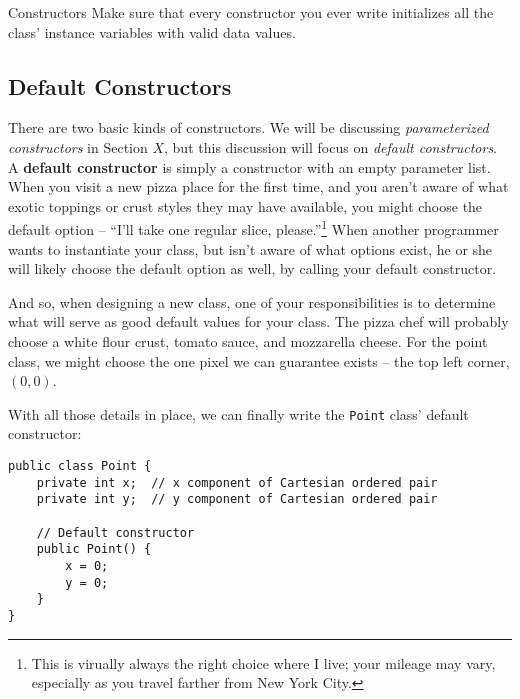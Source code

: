 \begin{tip}{Constructors}
    Make sure that every constructor you ever write initializes all the class' instance variables with valid data values.
\end{tip}

\subsection{Default Constructors}

There are two basic kinds of constructors.  We will be discussing \textit{parameterized constructors} in Section $X$, but this discussion will focus on \textit{default constructors}.  A \textbf{default constructor} is simply a constructor with an empty parameter list.  When you visit a new pizza place for the first time, and you aren't aware of what exotic toppings or crust styles they may have available, you might choose the default option -- ``I'll take one regular slice, please.''\footnote{This is virually always the right choice where I live; your mileage may vary, especially as you travel farther from New York City.}  When another programmer wants to instantiate your class, but isn't aware of what options exist, he or she will likely choose the default option as well, by calling your default constructor.

And so, when designing a new class, one of your responsibilities is to determine what will serve as good default values for your class.  The pizza chef will probably choose a white flour crust, tomato sauce, and mozzarella cheese.  For the point class, we might choose the one pixel we can guarantee exists -- the top left corner, $(0,0)$.

With all those details in place, we can finally write the \texttt{Point} class' default constructor:

\begin{verbatim}
public class Point {
    private int x;  // x component of Cartesian ordered pair
    private int y;  // y component of Cartesian ordered pair

    // Default constructor
    public Point() {
        x = 0;
        y = 0;
    }
}
\end{verbatim}
